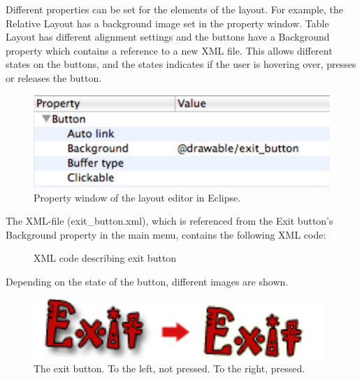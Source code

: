 Different properties can be set for the elements of the layout. For example, the Relative Layout has a background image set in the property window. Table Layout has different alignment settings and the buttons have a Background property which contains a reference to a new XML file. This allows different states on the buttons, and the states indicates if the user is hovering over, presses or releases the button.

\begin{figure}[here]
\begin{center}
\includegraphics[scale=1]{pics/chapters/chapter4/exitbuttonref}
\end{center}
\caption{Property window of the layout editor in Eclipse.}
\label{fig:propWindowLayoutEditorEclipse}
\end{figure}

The XML-file (exit\_button.xml), which is referenced from the Exit button's Background property in the main menu, contains the following XML code:

\begin{figure}[htb]

\begin{small}

\end{small}

\caption{XML code describing exit button}
\label{fig:codeExXMLExitButton}
\end{figure}

\clearpage

Depending on the state of the button, different images are shown.

\begin{figure}[here]

\begin{center}
\includegraphics[scale=1]{pics/chapters/chapter4/exitbutton}
\end{center}

\caption{The exit button. To the left, not pressed. To the right, pressed.}
\label{fig:exitButtonPressed}
\end{figure}

